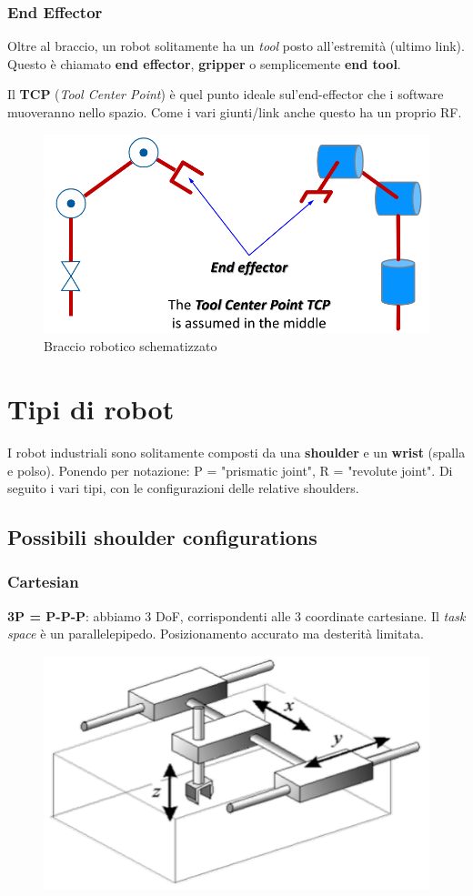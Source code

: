 \subsubsection{End Effector}

Oltre al braccio, un robot solitamente ha un \textit{tool} posto all'estremità (ultimo link). Questo è chiamato \textbf{end effector}, \textbf{gripper} o semplicemente \textbf{end tool}.

Il \textbf{TCP} (\textit{Tool Center Point}) è quel punto ideale sul'end-effector che i software muoveranno nello spazio. Come i vari giunti/link anche questo ha un proprio RF.

\begin{figure}
	\centering
	\includegraphics[width=0.6\linewidth]{images/kinematic_chains_5}
	\caption{Braccio robotico schematizzato}
	\label{fig:kinematicchains5}
\end{figure}



\section{Tipi di robot}

I robot industriali sono solitamente composti da una \textbf{shoulder} e un \textbf{wrist} (spalla e polso). Ponendo per notazione: P = "prismatic joint", R = "revolute joint". Di seguito i vari tipi, con le configurazioni delle relative shoulders.

\subsection{Possibili shoulder configurations}

\subsubsection{Cartesian}
\textbf{3P = P-P-P}: abbiamo 3 DoF, corrispondenti alle 3 coordinate cartesiane. Il \textit{task space} è un parallelepipedo. Posizionamento accurato ma desterità limitata.
\begin{figure}[H]
	\centering
	\includegraphics[width=0.35\linewidth]{images/kinematic_chains_6}
\end{figure}


